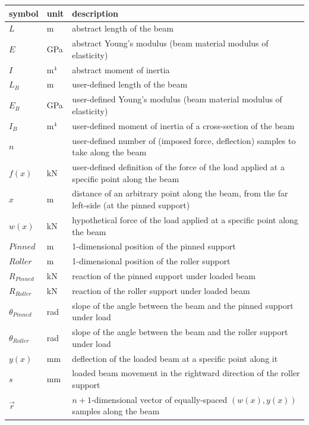 \documentclass[12pt]{article}
\begin{document}
\renewcommand{\arraystretch}{1.2}
\noindent
\begin{longtable*}{l l p{12cm}}
    \toprule
    \textbf{symbol} & \textbf{unit} & \textbf{description}\\
    \midrule
    \(L\) & \si{\metre} & abstract length of the beam \\
    \(E\) & \si{\giga\pascal} & abstract Young's modulus (beam material modulus of elasticity) \\
    \(I\) & \(\si{\metre{}}^{4}\) & abstract moment of inertia \\
    \(L_{B}\) & \si{\metre} & user-defined length of the beam \\
    \(E_{B}\) & \si{\giga\pascal} & user-defined Young's modulus (beam material modulus of elasticity) \\
    \(I_{B}\) & \(\si{\metre{}}^{4}\) & user-defined moment of inertia of a cross-section of the beam \\
    \(n\) & \textemdash{} & user-defined number of (imposed force, deflection) samples to take along the beam \\
    \(f(x)\) & \si{\kilo\newton} & user-defined definition of the force of the load applied at a specific point along the beam \\
    \(x\) & \si{\metre} & distance of an arbitrary point along the beam, from the far left-side (at the pinned support) \\
    \(w(x)\) & \si{\kilo\newton} & hypothetical force of the load applied at a specific point along the beam \\
    \(\mathit{Pinned}\) & \si{\metre} & 1-dimensional position of the pinned support \\
    \(\mathit{Roller}\) & \si{\metre} & 1-dimensional position of the roller support \\
    \(R_{\mathit{Pinned}}\) & \si{\kilo\newton} & reaction of the pinned support under loaded beam \\
    \(R_{\mathit{Roller}}\) & \si{\kilo\newton} & reaction of the roller support under loaded beam \\
    \(\theta{}_{\mathit{Pinned}}\) & \si{\radian} & slope of the angle between the beam and the pinned support under load \\
    \(\theta{}_{\mathit{Roller}}\) & \si{\radian} & slope of the angle between the beam and the roller support under load \\
    \(y(x)\) & \si{\milli\metre} & deflection of the loaded beam at a specific point along it \\
    \(s\) & \si{\milli\metre} & loaded beam movement in the rightward direction of the roller support \\
    \(\vec{r}\) & \textemdash{} & $n+1$-dimensional vector of equally-spaced $(w(x),y(x))$ samples along the beam \\
    \bottomrule
\end{longtable*}
\end{document}
